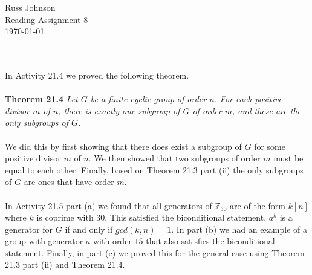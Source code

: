 \documentclass[11pt,a4paper]{article}
\begin{document}
\begin{flushright}
Russ Johnson\\
Reading Assignment 8\\
\today\\
\end{flushright}
~\\
~\\
In Activity 21.4 we proved the following theorem.\\
~\\
{\bf Theorem 21.4} {\it Let $G$ be a finite cyclic group of order $n$. For each positive divisor $m$ of $n$, there is exactly one subgroup of $G$ of order $m$, and these are the only subgroups of $G$.}\\
~\\
We did this by first showing that there does exist a subgroup of $G$ for some positive divisor $m$ of $n$. We then showed that two subgroups of order $m$ must be equal to each other. Finally, based on Theorem 21.3 part (ii) the only subgroups of $G$ are ones that have order $m$.\\
~\\
In Activity 21.5 part (a) we found that all generators of $\mathbb{Z}_{30}$ are of the form $k[n]$ where $k$ is coprime with $30$. This satisfied the biconditional statement, $a^k$ is a generator for $G$ if and only if $gcd(k,n)=1$. In part (b) we had an example of a group with generator $a$ with order $15$ that also satisfies the biconditional statement. Finally, in part (c) we proved this for the general case using Theorem 21.3 part (ii) and Theorem 21.4.
\end{document}
